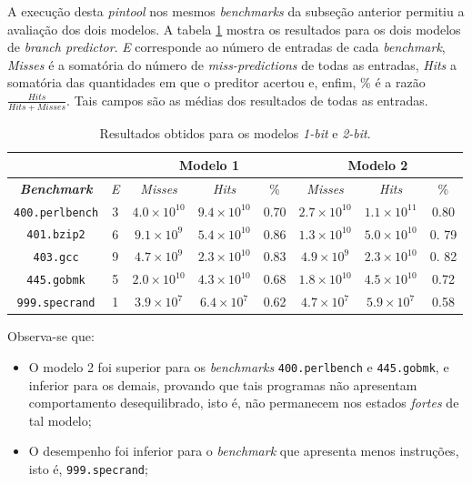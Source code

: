 \documentclass[12pt]{article}
\begin{document}
A execução desta \textit{pintool} nos mesmos \textit{benchmarks} da subseção
anterior permitiu a avaliação dos dois modelos.  A tabela
\ref{tab:modelos} mostra os resultados para os dois modelos de \textit{branch
predictor}. \textit{E} corresponde ao número de entradas de cada
\textit{benchmark}, \textit{Misses} é a somatória do número de
\textit{miss-predictions} de todas as entradas, \textit{Hits} a somatória das
quantidades em que o preditor acertou e, enfim, \% é a razão 
\(\frac{Hits}{Hits+Misses}\). Tais campos são as médias dos resultados de todas
as entradas.

 \begin{table}[h]
    \centering
	\caption{\label{tab:modelos} Resultados obtidos para os modelos \textit{1-bit}
	e \textit{2-bit}.}
	\begin{tabular}{| c | c | c | c | c | c | c | c |}
		\hline
		\multicolumn{2}{|c|}{} & \multicolumn{3}{c|}{\textbf{Modelo 1}} &
		\multicolumn{3}{|c|}{\textbf{Modelo 2}}	\\ 	\hline 
		\textit{\textbf{Benchmark}} & \textit{E}  & \textit{Misses} & \textit{Hits} &
		\% & \textit{Misses} & \textit{Hits} & \% \\
		\hline \hline \texttt{400.perlbench} & 3 & \(4.0\times10^{10}\) &
		\(9.4\times10^{10}\) & 0.70 & \(2.7\times10^{10}\) & \(1.1\times10^{11}\)
		& 0.80 \\
		\hline \texttt{401.bzip2} & 6 & \(9.1\times10^{9}\) & \(5.4\times10^{10}\) &
		0.86 & \(1.3\times10^{10}\) & \(5.0\times10^{10}\) & 0. 79 \\ \hline
		\texttt{403.gcc} & 9 & \(4.7\times10^{9}\) & \(2.3\times10^{10}\) &
		0.83 & \(4.9\times10^{9}\) & \(2.3\times10^{10}\) & 0. 82 \\ \hline
		\texttt{445.gobmk} & 5 & \(2.0\times10^{10}\) & \(4.3\times10^{10}\)  & 0.68 &
		\(1.8\times10^{10}\) & \(4.5\times10^{10}\) & 0.72 \\ \hline
		\texttt{999.specrand} & 1 & \(3.9\times10^{7}\) & \(6.4\times10^{7}\) & 0.62 &
		\(4.7\times10^{7}\) & \(5.9\times10^{7}\) & 0.58\\ \hline
	\end{tabular}	    
\end{table} 

Observa-se que:

\begin {itemize}
  \item O modelo 2 foi superior para os \textit{benchmarks}
  \texttt{400.perlbench} e \texttt{445.gobmk}, e inferior para os demais,
  provando que tais programas não apresentam comportamento desequilibrado, isto
  é, não permanecem nos estados \textit{fortes} de tal modelo;
  \item O desempenho foi inferior para o \textit{benchmark} que apresenta menos
  instruções, isto é, \texttt{999.specrand}; 
\end{itemize} 
\end{document}
